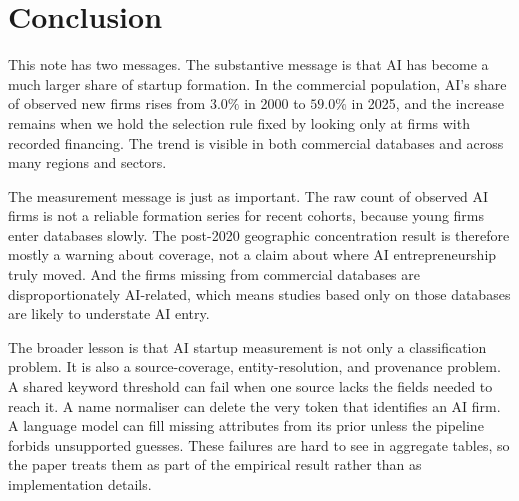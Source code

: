 %  

\section{Conclusion}

This note has two messages. The substantive message is that AI has become a
much larger share of startup formation. In the commercial population, AI's
share of observed new firms rises from $3.0\%$ in 2000 to $59.0\%$ in 2025, and
the increase remains when we hold the selection rule fixed by looking only at
firms with recorded financing. The trend is visible in both commercial
databases and across many regions and sectors.

The measurement message is just as important. The raw count of observed AI
firms is not a reliable formation series for recent cohorts, because young
firms enter databases slowly. The post-2020 geographic concentration result is
therefore mostly a warning about coverage, not a claim about where AI
entrepreneurship truly moved. And the firms missing from commercial databases
are disproportionately AI-related, which means studies based only on those
databases are likely to understate AI entry.

The broader lesson is that AI startup measurement is not only a classification
problem. It is also a source-coverage, entity-resolution, and provenance
problem. A shared keyword threshold can fail when one source lacks the fields
needed to reach it. A name normaliser can delete the very token that identifies
an AI firm. A language model can fill missing attributes from its prior unless
the pipeline forbids unsupported guesses. These failures are hard to see in
aggregate tables, so the paper treats them as part of the empirical result
rather than as implementation details.
